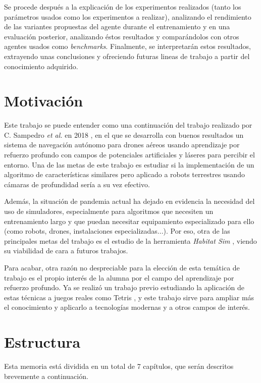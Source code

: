 Se procede después a la explicación de los experimentos realizados (tanto los parámetros usados como los experimentos a realizar), analizando el rendimiento de las variantes propuestas del agente durante el entrenamiento y en una evaluación posterior, analizando éstos resultados y comparándolos con otros agentes usados como \textit{benchmarks}. Finalmente, se interpretarán estos resultados, extrayendo unas conclusiones y ofreciendo futuras lineas de trabajo a partir del conocimiento adquirido.

\section{Motivación}

Este trabajo se puede entender como una continuación del trabajo realizado por C. Sampedro \textit{et al.} en 2018 \cite{Sampedro2018}, en el que se desarrolla con buenos resultados un sistema de navegación autónomo para drones aéreos usando aprendizaje por refuerzo profundo con campos de potenciales artificiales y láseres para percibir el entorno. Una de las metas de este trabajo es estudiar si la implementación de un algoritmo de características similares pero aplicado a robots terrestres usando cámaras de profundidad sería a su vez efectivo.

Además, la situación de pandemia actual ha dejado en evidencia la necesidad del uso de simuladores, especialmente para algoritmos que necesiten un entrenamiento largo y que puedan necesitar equipamiento especializado para ello (como robots, drones, instalaciones especializadas...). Por eso, otra de las principales metas del trabajo es el estudio de la herramienta \textit{Habitat Sim} \cite{habitat19iccv} \cite{szot2021habitat}, viendo su viabilidad de cara a futuros trabajos.

Para acabar, otra razón no despreciable para la elección de esta temática de trabajo es el propio interés de la alumna por el campo del aprendizaje por refuerzo profundo. Ya se realizó un trabajo previo estudiando la aplicación de estas técnicas a juegos reales como Tetris \cite{Jimenez2020}, y este trabajo sirve para ampliar más el conocimiento y aplicarlo a tecnologías modernas y a otros campos de interés.

\section{Estructura}


Esta memoria está dividida en un total de 7 capítulos, que serán descritos brevemente a continuación.

